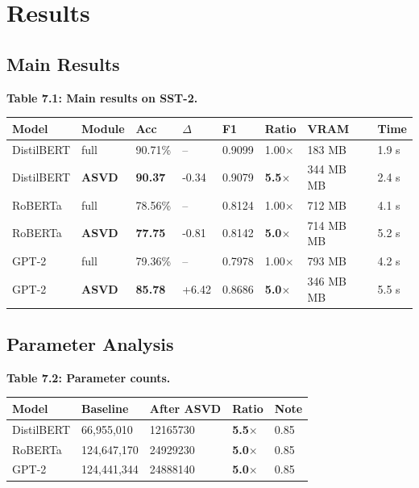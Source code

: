 \section{Results}

\subsection{Main Results}

\textbf{Table 7.1: Main results on SST-2.}

\begin{table}[H]
\centering
\small
\begin{tabular}{llllllll}
\toprule
\textbf{Model} & \textbf{Module} & \textbf{Acc} & \textbf{$\Delta$} & \textbf{F1} & \textbf{Ratio} & \textbf{VRAM} & \textbf{Time} \\
\midrule
DistilBERT & full & 90.71\% & -- & 0.9099 & 1.00$\times$ & 183 MB & 1.9 s \\
DistilBERT & \textbf{ASVD} & \textbf{90.37} & -0.34 & 0.9079 & \textbf{5.5$\times$} & 344 MB MB & 2.4 s \\
RoBERTa & full & 78.56\% & -- & 0.8124 & 1.00$\times$ & 712 MB & 4.1 s \\
RoBERTa & \textbf{ASVD} & \textbf{77.75} & -0.81 & 0.8142 & \textbf{5.0$\times$} & 714 MB MB & 5.2 s \\
GPT-2 & full & 79.36\% & -- & 0.7978 & 1.00$\times$ & 793 MB & 4.2 s \\
GPT-2 & \textbf{ASVD} & \textbf{85.78} & +6.42 & 0.8686 & \textbf{5.0$\times$} & 346 MB MB & 5.5 s \\
\bottomrule
\end{tabular}
\end{table}

\subsection{Parameter Analysis}

\textbf{Table 7.2: Parameter counts.}

\begin{table}[H]
\centering
\small
\begin{tabular}{lllll}
\toprule
\textbf{Model} & \textbf{Baseline} & \textbf{After ASVD} & \textbf{Ratio} & \textbf{Note} \\
\midrule
DistilBERT & 66,955,010 & 12165730 & \textbf{5.5$\times$} & 0.85 \\
RoBERTa & 124,647,170 & 24929230 & \textbf{5.0$\times$} & 0.85 \\
GPT-2 & 124,441,344 & 24888140 & \textbf{5.0$\times$} & 0.85 \\
\bottomrule
\end{tabular}
\end{table}

